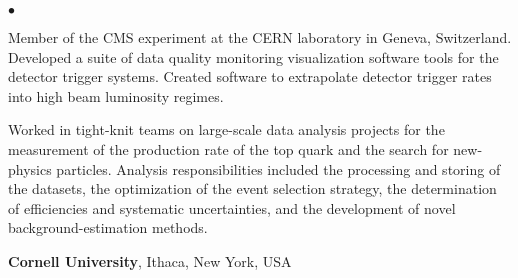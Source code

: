 \documentclass[margin,line]{res}
\newenvironment{list2}{
  \begin{list}{$\bullet$}{%
      \setlength{\itemsep}{0in}
      \setlength{\parsep}{0in} \setlength{\parskip}{0in}
      \setlength{\topsep}{0in} \setlength{\partopsep}{0in}
      \setlength{\leftmargin}{0.2in}}}{\end{list}}
\begin{document}
\begin{resume}
\begin{list2}


\item Member of the CMS experiment at the CERN laboratory in Geneva,
  Switzerland. Developed a suite of data quality monitoring
  visualization software tools for the detector trigger systems.
  Created software to extrapolate detector trigger rates into high beam
  luminosity regimes.
\item Worked in tight-knit teams on large-scale data analysis projects
  for the measurement of the production rate of the top quark and the
  search for new-physics particles.  Analysis responsibilities
  included the processing and storing of the datasets, the
  optimization of the event selection strategy, the determination of
  efficiencies and systematic uncertainties, and the development of
  novel background-estimation methods.

\end{list2}

{\bf Cornell University}, Ithaca, New York, USA


\end{resume}
\end{document}

